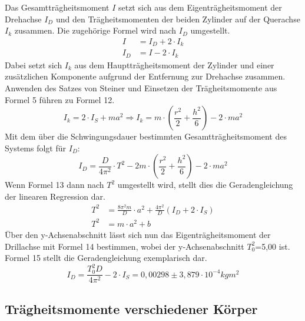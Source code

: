 \documentclass[titlepage = firstcover]{scrartcl}
\begin{document}
      Das Gesamtträgheitsmoment $I$ setzt sich aus dem Eigenträgheitsmoment der Drehachse $I_D$ und den Trägheitsmomenten der beiden Zylinder auf der Querachse 
      $I_k$ zusammen. Die zugehörige Formel wird nach $I_D$ umgestellt.
      \begin{align*}
        I &= I_D + 2 \cdot I_k \\
        I_D &= I -2 \cdot I_k
      \end{align*}
      Dabei setzt sich $I_k$ aus dem Hauptträgheitsmoment der Zylinder und einer zusätzlichen Komponente aufgrund der Entfernung zur Drehachse zusammen.
      Anwenden des Satzes von Steiner und Einsetzen der Trägheitsmomente aus Formel 5 führen zu Formel 12.
      \begin{equation}
        I_k = 2 \cdot I_S + ma^2 \Rightarrow I_k = m \cdot (\frac{r^2}{2} + \frac{h^2}{6}) - 2 \cdot ma^2
      \end{equation}
      Mit dem über die Schwingungsdauer bestimmten Gesamtträgheitsmoment des Systems folgt für $I_D$:
      \begin{equation}
        I_D = \frac{D}{4\pi^2} \cdot T^2 - 2m \cdot (\frac{r^2}{2} + \frac{h^2}{6}) - 2 \cdot ma^2
      \end{equation}
      Wenn Formel 13 dann nach $T^2$ umgestellt wird, stellt dies die Geradengleichung der linearen Regression dar.
      \begin{align}
        T^2 &= \frac{8\pi^2m}{D} \cdot a^2  + \frac{4\pi^2}{D}(I_D + 2 \cdot I_S) \\
        T^2 &= m \cdot a^2 + b
      \end{align}
      Über den y-Achsenabschnitt lässt sich nun das Eigenträgheitsmoment der Drillachse mit Formel 14 bestimmen, wobei der y-Achsenabschnitt $T_0^2$=5,00 ist.
      Formel 15 stellt die Geradengleichung exemplarisch dar.
      \begin{equation*}
        I_D = \frac{T_0^2D}{4\pi^2} - 2 \cdot I_S = 0,00298 \pm 3,879 \cdot 10^{-4}kgm^2
      \end{equation*}
      \newpage

      \subsection{Trägheitsmomente verschiedener Körper}
      
     
      
\end{document}
